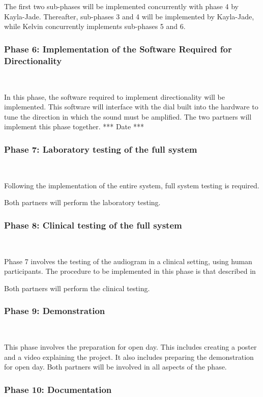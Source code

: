 \documentclass[10pt,twocolumn]{witseiepaper}
\begin{document}
The first two sub-phases will be implemented concurrently with phase 4 by Kayla-Jade. Thereafter, sub-phases 3 and 4 will be implemented by Kayla-Jade, while Kelvin concurrently implements sub-phases 5 and 6.


\subsubsection*{Phase 6: Implementation of the Software Required for Directionality} $    $

In this phase, the software required to implement directionality will be implemented. This software will interface with the dial built into the hardware to tune the direction in which the sound must be amplified. The two partners will implement this phase together. 
*** Date ***

\subsubsection*{Phase 7: Laboratory testing of the full system} $    $

Following the implementation of the entire system, full system testing is required. 

Both partners will perform the laboratory testing.

\subsubsection*{Phase 8: Clinical testing of the full system} $    $

Phase 7 involves the testing of the audiogram in a clinical setting, using human participants. The procedure to be implemented in this phase is that described in 

Both partners will perform the clinical testing.

\subsubsection*{Phase 9: Demonstration} $    $

This phase involves the preparation for open day. This includes creating a poster and a video explaining the project. It also includes preparing the demonstration for open day. Both partners will be involved in all aspects of the phase.

\subsubsection*{Phase 10: Documentation} $    $
\end{document}
